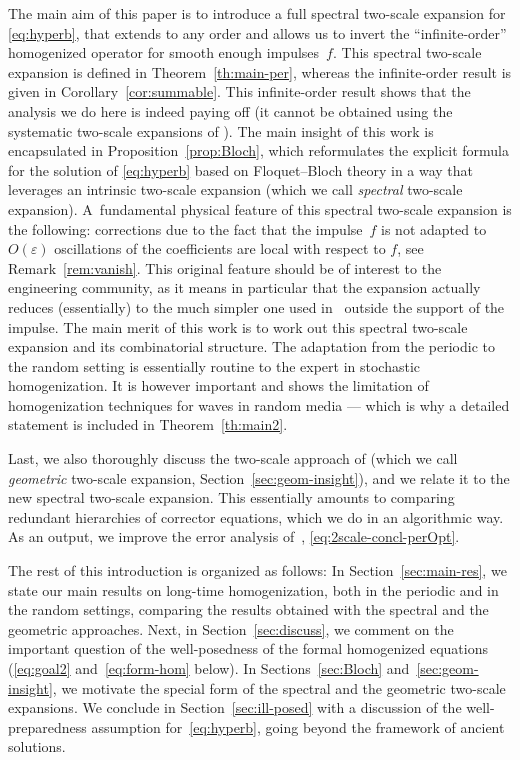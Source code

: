\documentclass[10pt]{amsart}
\theoremstyle{plain}
\theoremstyle{definition}
\numberwithin{equation}{section}
\newcommand{\e}{\varepsilon}
\begin{document}
The main aim of this paper is to introduce a full spectral two-scale expansion for \eqref{eq:hyperb}, that extends \cite{BG} to any order and allows us to invert the ``infinite-order'' homogenized operator for smooth enough impulses~$f$.
This spectral two-scale expansion is defined in Theorem~\ref{th:main-per}, whereas the infinite-order result is given in Corollary~\ref{cor:summable}. This infinite-order result shows that the analysis we do here is indeed paying off (it cannot be obtained using the systematic two-scale expansions of \cite{ALR,Pouch-17,Pouch-19}).
The main insight of this work is encapsulated in Proposition~\ref{prop:Bloch}, which reformulates the
explicit formula for the solution of \eqref{eq:hyperb} based on Floquet--Bloch theory in a way that leverages an intrinsic two-scale expansion (which we call \emph{spectral} two-scale expansion).
A~fundamental physical feature of this spectral two-scale expansion is the following: corrections due to the fact that the impulse~$f$ is not adapted to $O(\e)$ oscillations of the coefficients
are local with respect to $f$,
see Remark~\ref{rem:vanish}. This original feature should be of interest to the engineering community, as it means in particular that the expansion actually reduces (essentially) to the much simpler one used in~\cite{BG} outside the support of the impulse.
The main merit of this work is to work out this spectral two-scale expansion and its combinatorial structure.
The adaptation from the periodic to the random setting is essentially routine to the expert in stochastic homogenization.
It is however important and shows the limitation of homogenization techniques for waves in random media --- which is why a detailed statement is included in Theorem~\ref{th:main2}.

Last,
we also thoroughly discuss the two-scale approach of \cite{ALR,Pouch-17,Pouch-19} (which we call \emph{geometric} two-scale expansion, \cf Section~\ref{sec:geom-insight}), and we relate it to the new spectral two-scale expansion. This essentially amounts to comparing
redundant hierarchies of corrector equations, which we do in an algorithmic way. As an output, we
improve the error analysis of~\cite{ALR,Pouch-17,Pouch-19}, \cf \eqref{eq:2scale-concl-perOpt}.

The rest of this introduction is organized as follows: In Section~\ref{sec:main-res}, we state our main results on long-time homogenization, both in the periodic and in the random settings, comparing the results obtained with the spectral and the geometric approaches.
Next, in Section~\ref{sec:discuss}, we comment on the important question of the well-posedness of the formal homogenized equations (\cf \eqref{eq:goal2} and~\eqref{eq:form-hom} below). In Sections~\ref{sec:Bloch} and~\ref{sec:geom-insight}, we motivate the special form of the spectral and the {geometric} two-scale expansions. We conclude in Section~\ref{sec:ill-posed} with a discussion of the well-preparedness assumption for~\eqref{eq:hyperb}, going beyond the framework of ancient solutions.
\end{document}
